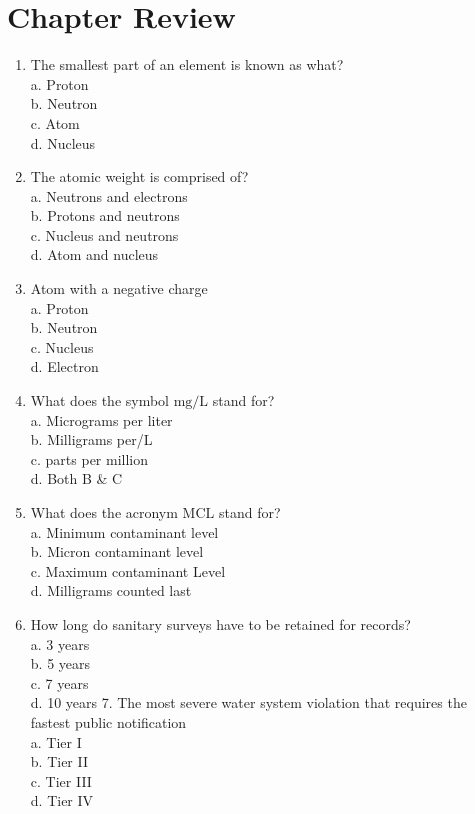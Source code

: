 \documentclass[10pt]{article}
\begin{document}
\section{Chapter Review}
\begin{enumerate}
  \item The smallest part of an element is known as what?\\
a. Proton\\
b. Neutron\\
c. Atom\\
d. Nucleus

  \item The atomic weight is comprised of?\\
a. Neutrons and electrons\\
b. Protons and neutrons\\
c. Nucleus and neutrons\\
d. Atom and nucleus

  \item Atom with a negative charge\\
a. Proton\\
b. Neutron\\
c. Nucleus\\
d. Electron

  \item What does the symbol $\mathrm{mg} / \mathrm{L}$ stand for?\\
a. Micrograms per liter\\
b. Milligrams per/L\\
c. parts per million\\
d. Both B \& C

  \item What does the acronym $\mathrm{MCL}$ stand for?\\
a. Minimum contaminant level\\
b. Micron contaminant level\\
c. Maximum contaminant Level\\
d. Milligrams counted last

  \item How long do sanitary surveys have to be retained for records?\\
a. 3 years\\
b. 5 years\\
c. 7 years\\
d. 10 years 7. The most severe water system violation that requires the fastest public notification\\
a. Tier I\\
b. Tier II\\
c. Tier III\\
d. Tier IV


\end{enumerate}
\end{document}
